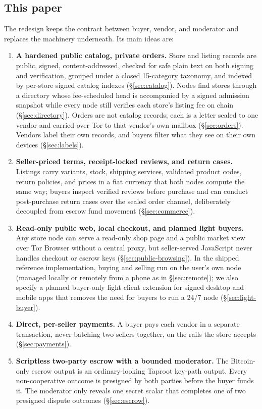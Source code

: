 \subsection{This paper}

The redesign keeps the contract between buyer, vendor, and moderator and replaces the machinery underneath. Its main ideas are:
\begin{enumerate}
  \item \textbf{A hardened public catalog, private orders.} Store and listing records are public, signed, content-addressed, checked for safe plain text on both signing and verification, grouped under a closed 15-category taxonomy, and indexed by per-store signed catalog indexes (\S\ref{sec:catalog}). Nodes find stores through a directory whose fee-scheduled head is accompanied by a signed admission snapshot while every node still verifies each store's listing fee on chain (\S\ref{sec:directory}). Orders are not catalog records; each is a letter sealed to one vendor and carried over Tor to that vendor's own mailbox (\S\ref{sec:orders}). Vendors label their own records, and buyers filter what they see on their own devices (\S\ref{sec:labels}).
  \item \textbf{Seller-priced terms, receipt-locked reviews, and return cases.} Listings carry variants, stock, shipping services, validated product codes, return policies, and prices in a fiat currency that both nodes compute the same way; buyers inspect verified reviews before purchase and can conduct post-purchase return cases over the sealed order channel, deliberately decoupled from escrow fund movement (\S\ref{sec:commerce}).
  \item \textbf{Read-only public web, local checkout, and planned light buyers.} Any store node can serve a read-only shop page and a public market view over Tor Browser without a central proxy, but seller-served JavaScript never handles checkout or escrow keys (\S\ref{sec:public-browsing}). In the shipped reference implementation, buying and selling run on the user's own node (managed locally or remotely from a phone as in \S\ref{sec:remote}); we also specify a planned buyer-only light client extension for signed desktop and mobile apps that removes the need for buyers to run a 24/7 node (\S\ref{sec:light-buyer}).
  \item \textbf{Direct, per-seller payments.} A buyer pays each vendor in a separate transaction, never batching two sellers together, on the rails the store accepts (\S\ref{sec:payments}).
  \item \textbf{Scriptless two-party escrow with a bounded moderator.} The Bitcoin-only escrow output is an ordinary-looking Taproot key-path output. Every non-cooperative outcome is presigned by both parties before the buyer funds it. The moderator only reveals one secret scalar that completes one of two presigned dispute outcomes (\S\ref{sec:escrow}).
\end{enumerate}

